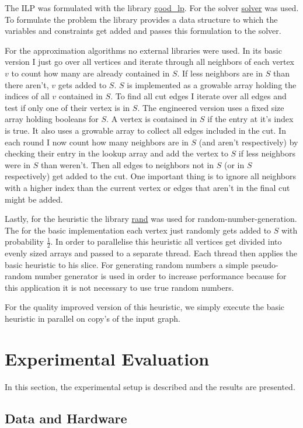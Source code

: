 \documentclass[twocolumn]{article}
\begin{document}
The ILP was formulated with the library \href{https://crates.io/crates/good\_lp}{good\_lp}. For the solver \href{d}{solver} was used.
To formulate the problem the library provides a data structure to which the variables and constraints get added and passes this
formulation to the solver.

For the approximation algorithms no external libraries were used. 
In its basic version I just go over all vertices and iterate through all neighbors of each vertex $v$ to count how many are already contained in $S$.
If less neighbors are in $S$ than there aren't, $v$ gets added to $S$. $S$ is implemented as a growable array holding the indices of all $v$ contained in $S$.
To find all cut edges I iterate over all edges and test if only one of their vertex is in $S$.
The engineered version uses a fixed size array holding booleans for $S$. A vertex is contained in $S$ if the entry at it's index is true.
It also uses a growable array to collect all edges included in the cut. In each round I now count how many neighbors are in $S$ (and aren't respectively) by checking their entry in
the lookup array and add the vertex to $S$ if less neighbors were in $S$ than weren't. Then all edges to neighbors not in $S$ (or in $S$ respectively) get added to the cut.
One important thing is to ignore all neighbors with a higher index than the current vertex or edges that aren't in the final cut might be added.

Lastly, for the heuristic the library \href{https://crates.io/crates/rand}{rand} was used for random-number-generation.
The for the basic implementation each vertex just randomly gets added to $S$ with probability $\frac{1}{2}$.
In order to parallelise this heuristic all vertices get divided into evenly sized arrays and passed to a separate thread.
Each thread then applies the basic heuristic to his slice. For generating random numbers a simple pseudo-random number generator is used
in order to increase performance because for this application it is not necessary to use true random numbers.

For the quality improved version of this heuristic, we simply execute the basic heuristic
in parallel on copy's of the input graph.

\section{Experimental Evaluation}
In this section, the experimental setup is described and the results are presented.
\subsection{Data and Hardware}%
\label{sub:Data and Hardware}
\end{document}
